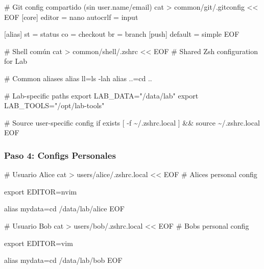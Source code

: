 \documentclass[
  doc,
  floatsintext,
  longtable,
  a4paper,
  nolmodern,
  notxfonts,
  notimes,
  12pt,
  colorlinks=true,linkcolor=blue,citecolor=blue,urlcolor=blue]{apa7}
\newenvironment{Shaded}{\begin{snugshade}}{\end{snugshade}}
\newcommand{\CommentTok}[1]{\textcolor[rgb]{0.37,0.37,0.37}{#1}}
\newcommand{\FunctionTok}[1]{\textcolor[rgb]{0.28,0.35,0.67}{#1}}
\newcommand{\NormalTok}[1]{\textcolor[rgb]{0.00,0.23,0.31}{#1}}
\newcommand{\OperatorTok}[1]{\textcolor[rgb]{0.37,0.37,0.37}{#1}}
\newcommand{\StringTok}[1]{\textcolor[rgb]{0.13,0.47,0.30}{#1}}
\begin{document}
\begin{Shaded}
\begin{Highlighting}[]
\CommentTok{\# Git config compartido (sin user.name/email)}
\FunctionTok{cat} \OperatorTok{\textgreater{}}\NormalTok{ common/git/.gitconfig }\OperatorTok{\textless{}\textless{} \textquotesingle{}EOF\textquotesingle{}}
\StringTok{[core]}
\StringTok{    editor = nano}
\StringTok{    autocrlf = input}

\StringTok{[alias]}
\StringTok{    st = status}
\StringTok{    co = checkout}
\StringTok{    br = branch}
\StringTok{    }
\StringTok{[push]}
\StringTok{    default = simple}
\OperatorTok{EOF}

\CommentTok{\# Shell común}
\FunctionTok{cat} \OperatorTok{\textgreater{}}\NormalTok{ common/shell/.zshrc }\OperatorTok{\textless{}\textless{} \textquotesingle{}EOF\textquotesingle{}}
\StringTok{\# Shared Zsh configuration for Lab}

\StringTok{\# Common aliases}
\StringTok{alias ll=\textquotesingle{}ls {-}lah\textquotesingle{}}
\StringTok{alias ..=\textquotesingle{}cd ..\textquotesingle{}}

\StringTok{\# Lab{-}specific paths}
\StringTok{export LAB\_DATA="/data/lab"}
\StringTok{export LAB\_TOOLS="/opt/lab{-}tools"}

\StringTok{\# Source user{-}specific config if exists}
\StringTok{[ {-}f \textasciitilde{}/.zshrc.local ] \&\& source \textasciitilde{}/.zshrc.local}
\OperatorTok{EOF}
\end{Highlighting}
\end{Shaded}

\subsubsection{Paso 4: Configs
Personales}\label{paso-4-configs-personales}

\begin{Shaded}
\begin{Highlighting}[]
\CommentTok{\# Usuario Alice}
\FunctionTok{cat} \OperatorTok{\textgreater{}}\NormalTok{ users/alice/.zshrc.local }\OperatorTok{\textless{}\textless{} \textquotesingle{}EOF\textquotesingle{}}
\StringTok{\# Alice\textquotesingle{}s personal config}

\StringTok{export EDITOR=nvim}

\StringTok{alias mydata=\textquotesingle{}cd /data/lab/alice\textquotesingle{}}
\OperatorTok{EOF}

\CommentTok{\# Usuario Bob}
\FunctionTok{cat} \OperatorTok{\textgreater{}}\NormalTok{ users/bob/.zshrc.local }\OperatorTok{\textless{}\textless{} \textquotesingle{}EOF\textquotesingle{}}
\StringTok{\# Bob\textquotesingle{}s personal config}

\StringTok{export EDITOR=vim}

\StringTok{alias mydata=\textquotesingle{}cd /data/lab/bob\textquotesingle{}}
\OperatorTok{EOF}
\end{Highlighting}
\end{Shaded}
\end{document}
